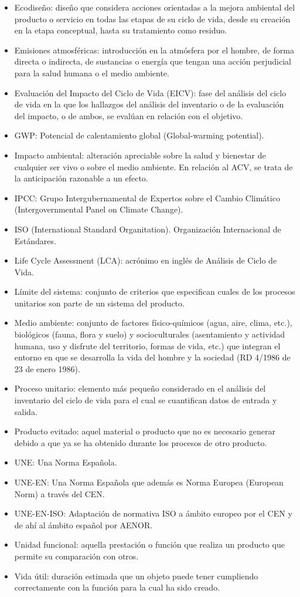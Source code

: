 \begin{itemize}
  \item Ecodiseño: diseño que considera acciones orientadas a la mejora ambiental del producto o servicio en todas las etapas de su ciclo de vida, desde su creación en la etapa conceptual, hasta su tratamiento como residuo.
  \item Emisiones atmosféricas: introducción en la atmósfera por el hombre, de forma directa o indirecta, de sustancias o energía que tengan una acción perjudicial para la salud humana o el medio ambiente.
  \item Evaluación del Impacto del Ciclo de Vida (EICV): fase del análisis del ciclo de vida en la que los hallazgos del análisis del inventario o de la evaluación del impacto, o de ambos, se evalúan en relación con el objetivo.
  \item GWP: Potencial de calentamiento global (Global-warming potential).
  \item Impacto ambiental: alteración apreciable sobre la salud y bienestar de cualquier ser vivo o sobre el medio ambiente. En relación al ACV, se trata de la anticipación razonable a un efecto.
  \item IPCC: Grupo Intergubernamental de Expertos sobre el Cambio Climático (Intergovernmental Panel on Climate Change).
  \item ISO (International Standard Organitation). Organización Internacional de Estándares.
  \item Life Cycle Assessment (LCA): acrónimo en inglés de Análisis de Ciclo de Vida.
  \item Límite del sistema: conjunto de criterios que especifican cuales de los procesos unitarios son parte de un sistema del producto.
  \item Medio ambiente: conjunto de factores físico-químicos (agua, aire, clima, etc.), biológicos (fauna, flora y suelo) y socioculturales (asentamiento y actividad humana, uso y disfrute del territorio, formas de vida, etc.) que integran el entorno en que se desarrolla la vida del hombre y la sociedad (RD 4/1986 de 23 de enero 1986).
  \item Proceso unitario: elemento más pequeño considerado en el análisis del inventario del ciclo de vida para el cual se cuantifican datos de entrada y salida.
  \item Producto evitado: aquel material o producto que no es necesario generar debido a que ya se ha obtenido durante los procesos de otro producto.
  \item UNE: Una Norma Española.
  \item UNE-EN: Una Norma Española que además es Norma Europea (European Norm) a través del CEN.
  \item UNE-EN-ISO: Adaptación de normativa ISO a ámbito europeo por el CEN y de ahí al ámbito español por AENOR.
  \item Unidad funcional: aquella prestación o función que realiza un producto que permite su comparación con otros.
  \item Vida útil: duración estimada que un objeto puede tener cumpliendo correctamente con la función para la cual ha sido creado.
\end{itemize}
